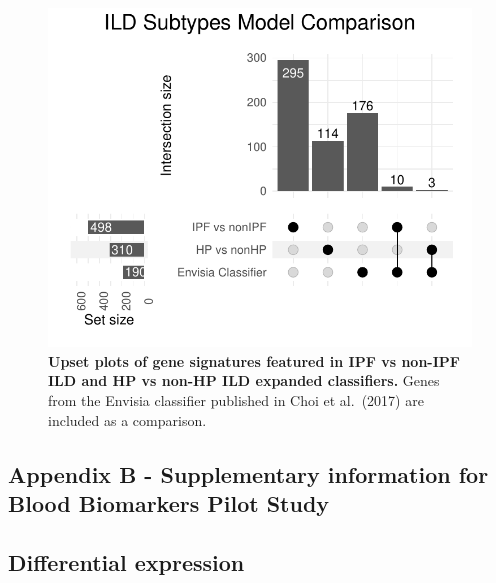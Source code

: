 \documentclass[
]{article}
\begin{document}
\begin{figure}

{\centering \includegraphics[width=0.6\linewidth,]{./Figures/SysReview/FigE10_Envisia} 

}

\caption[Envisia comparison]{\textbf{Upset plots of gene signatures featured in IPF vs non-IPF ILD and HP vs non-HP ILD expanded classifiers.} Genes from the Envisia classifier published in Choi et al.~(2017) are included as a comparison.}\label{fig:envisia}
\end{figure}

\clearpage

\subsection{Appendix B - Supplementary information for Blood Biomarkers Pilot Study}\label{appendix-b---supplementary-information-for-blood-biomarkers-pilot-study}

\renewcommand{\thefigure}{A3.\arabic{figure}}
\setcounter{figure}{0}
\renewcommand{\thetable}{A3.\arabic{table}}
\setcounter{table}{0}
\renewcommand{\theequation}{A3.\arabic{equation}}
\setcounter{equation}{0}

\captionsetup{width=6.5in}

\subsection{Differential expression}\label{differential-expression}
\end{document}
